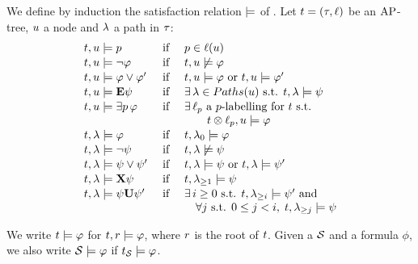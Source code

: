 \begin{definition}%
We define by induction the satisfaction relation $\models$ of
\QCTLs. Let   $t=(\tau,\ell)$ be
an $\textnormal{AP}$- tree, 
$u$  a node and $\tpath$  a path in $\tau$:
\[
\begin{array}{lcl}
  \ltree,\noeud\modelst p 			& \mbox{ if } & p\in\lab(\noeud)\\[1pt]
  \ltree,\noeud\modelst \neg \phi		& \mbox{ if } & \ltree,\noeud\not\modelst \phi\\[1pt]
  \ltree,\noeud\modelst \phi \ou \phi'		& \mbox{ if } & \ltree,\noeud \modelst \phi \mbox{ or    }\ltree,\noeud\modelst \phi' \\[1pt]
  \ltree,\noeud\modelst \E\psi			& \mbox{ if } & \exists\,\tpath\in\tPaths(\noeud) \mbox{      s.t. }\ltree,\tpath\modelst \psi \\[1pt]
  \ltree,\noeud\modelst \existsp \phi & \mbox{ if }
  & \exists\,\plab \mbox{ a $p$-\labeling for
    $\ltree$ s.t.
    }\\
  & & \quad \quad  \ltree\prodlab\plab,\noeud\modelst\phi\\[1pt]
\ltree,\tpath\modelst \phi 			& \mbox{ if } & \ltree,\tpath_{0}\modelst\phi \\[1pt] 
\ltree,\tpath\modelst \neg \psi 		& \mbox{ if }
&  \ltree,\tpath\not\modelst \psi \\[1pt] 
\ltree,\tpath\modelst \psi \ou \psi'			& \mbox{ if } & \ltree,\tpath \modelst \psi \mbox{ or }\ltree,\tpath\modelst \psi' \\[1pt] 
\ltree,\tpath\modelst \X\psi 				& \mbox{ if } & \ltree,\tpath_{\geq 1}\modelst \psi \\[1pt] 
\ltree,\tpath\modelst \psi\until\psi' 		& \mbox{ if }
& \exists\, i\geq 0 \mbox{ s.t.    }\ltree,\tpath_{\geq
                                                                i}\modelst\psi' \text{ and }\\
  & & \quad \forall j \text{ s.t. }0\leq j <i,\; \ltree,\tpath_{\geq j}\modelst\psi
\end{array}
\]
\end{definition}

We write $t\models\varphi$ for $t,r\models\varphi$,
where $r$ is the root of $t$.     Given a \KS $\KS$  and a
\QCTLs formula $\phi$, we also write $\KS\modelst\phi$ if
$\unfold[\KS]{\sstate}\modelst\phi$.

